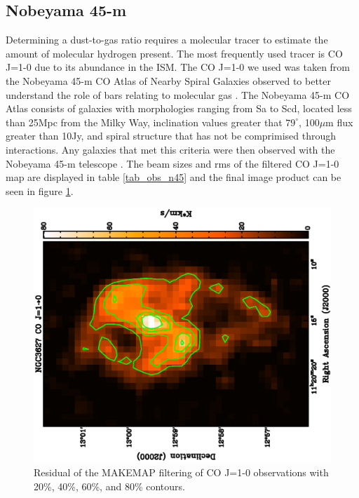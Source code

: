
\subsection{Nobeyama 45-m}\label{nob_sec}

Determining a dust-to-gas ratio requires a molecular tracer to estimate the amount of molecular hydrogen present.  The most frequently used tracer is CO J=1-0 due to its abundance in the ISM.  The CO J=1-0 we used was taken from the Nobeyama 45-m CO Atlas of Nearby Spiral Galaxies observed to better understand the role of bars relating to molecular gas \citep{kuno2007}.  The Nobeyama 45-m CO Atlas consists of galaxies with morphologies ranging from Sa to Scd, located less than 25Mpc from the Milky Way, inclination values greater that $79^{\circ}$, 100$\mu$m flux greater than 10Jy, and spiral structure that has not be comprimised through interactions.  Any galaxies that met this criteria were then observed with the Nobeyama 45-m telescope \citep{kuno2007}.  The beam sizes and rms of the filtered CO J=1-0 map are displayed in table \ref{tab_obs_n45} and the final image product can be seen in figure \ref{fig_co10}.

\begin{figure}
  \centering
  \includegraphics[width=1.\textwidth, angle=270]{obs_imgs/10_rem.eps}
  \caption[NGC3627 CO J=1-0 Observations]{Residual of the MAKEMAP filtering of CO J=1-0 observations with 20\%, 40\%, 60\%, and 80\% contours.}
  \label{fig_co10}
\end{figure}

